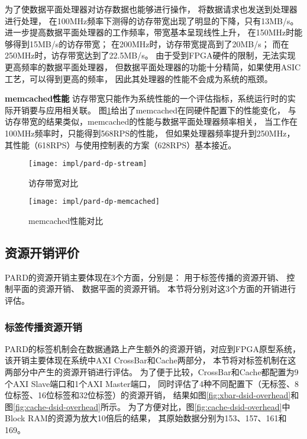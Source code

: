 为了使数据平面处理器对访存数据也能够进行操作，
将数据请求也发送到处理器进行处理，
在100MHz频率下测得的访存带宽出现了明显的下降，只有13MB/s。
进一步提高数据平面处理器的工作频率，带宽基本呈现线性上升，
在150MHz时能够得到15MB/s的访存带宽；
在200MHz时，访存带宽提高到了20MB/s；
而在250MHz时，访存带宽达到了22.5MB/s。
由于受到FPGA硬件的限制，无法实现更高频率的数据平面处理器，
但数据平面处理器的功能十分精简，如果使用ASIC工艺，可以得到更高的频率，
因此其处理器的性能不会成为系统的瓶颈。

\textbf{memcached性能}\quad
访存带宽只能作为系统性能的一个评估指标，系统运行时的实际开销要与应用相关联。
图\ref{fig:pard-dp-memcached}给出了memcached在同硬件配置下的性能变化，
与访存带宽的结果类似，memcached的性能与数据平面处理器频率相关，
当工作在100MHz频率时，只能得到568RPS的性能，
但如果处理器频率提升到250MHz，其性能（618RPS）与使用控制表的方案（628RPS）基本接近。

\begin{figure}[tb]
\begin{minipage}{0.48\textwidth}
  \centering
  \texttt{[image: impl/pard-dp-stream]}
  \caption{访存带宽对比}
  \label{fig:pard-dp-stream}
\end{minipage}\hfill
\begin{minipage}{0.48\textwidth}
  \centering
  \texttt{[image: impl/pard-dp-memcached]}
  \caption{memcached性能对比}
  \label{fig:pard-dp-memcached}
\end{minipage}
\end{figure}


\subsection{资源开销评价}

PARD的资源开销主要体现在3个方面，分别是：
用于标签传播的资源开销、
控制平面的资源开销、
数据平面的资源开销。
本节将分别对这3个方面的开销进行评估。

\subsubsection{标签传播资源开销}

PARD的标签机制会在数据通路上产生额外的资源开销，对应到FPGA原型系统，
该开销主要体现在系统中AXI CrossBar和Cache两部分，
本节将对标签机制在这两部分中产生的资源开销进行评估。
为了便于比较，CrossBar和Cache都配置为9个AXI Slave端口和1个AXI Master端口，
同时评估了4种不同配置下（无标签、8位标签、16位标签和32位标签）的资源开销，
结果如图\ref{fig:xbar-dsid-overhead}和图\ref{fig:cache-dsid-overhead}所示。
为了方便对比，图\ref{fig:cache-dsid-overhead}中Block RAM的资源为放大10倍后的结果，
其原始数据分别为153、157、161和169。

